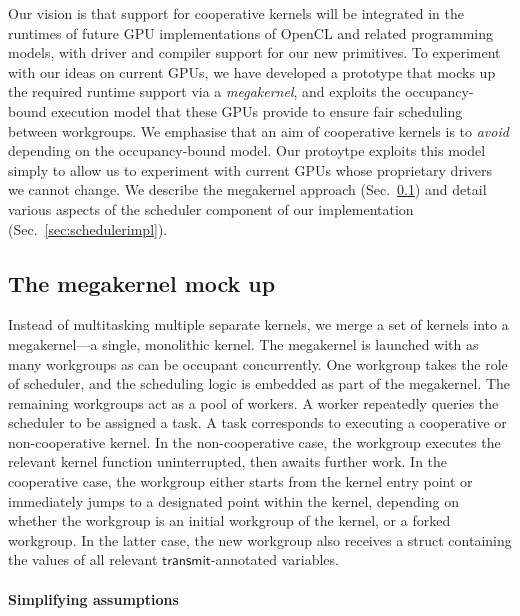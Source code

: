 \documentclass[numbers,nocopyrightspace,10pt]{sigplanconf}
\newcommand{\mysec}{Sec.~}
\newcommand{\transmit}{\mathsf{transmit}}
\begin{document}
Our vision is that support for cooperative kernels will be integrated
in the runtimes of future GPU implementations of OpenCL and related
programming models, with driver and compiler support for our new
primitives.  To experiment with our ideas on current GPUs, we have
developed a prototype that mocks up the required runtime support via a
\emph{megakernel}, and exploits the occupancy-bound execution model
that these GPUs provide to ensure fair scheduling between workgroups.
We emphasise that an aim of cooperative kernels is to \emph{avoid}
depending on the occupancy-bound model.  Our protoytpe exploits this
model simply to allow us to experiment with current GPUs whose
proprietary drivers we cannot change.  We describe the megakernel approach (\mysec\ref{sec:megakernel})
and detail various aspects of the scheduler component of our implementation (\mysec\ref{sec:schedulerimpl}).

\subsection{The megakernel mock up}\label{sec:megakernel}

Instead of multitasking multiple separate kernels, we merge a set of
kernels into a megakernel---a single, monolithic kernel.  The
megakernel is launched with as many workgroups as can be occupant
concurrently.  One workgroup takes the role of scheduler, and the
scheduling logic is embedded as part of the megakernel.  The remaining
workgroups act as a pool of workers.  A worker repeatedly queries the
scheduler to be assigned a task.  A task corresponds to executing a
cooperative or non-cooperative kernel.  In the non-cooperative case,
the workgroup executes the relevant kernel function uninterrupted,
then awaits further work.  In the cooperative case, the workgroup
either starts from the kernel entry point or immediately jumps to a
designated point within the kernel, depending on whether the workgroup
is an initial workgroup of the kernel, or a forked workgroup.  In the
latter case, the new workgroup also receives a struct containing the
values of all relevant $\transmit$-annotated variables.

\paragraph{Simplifying assumptions}
\end{document}
